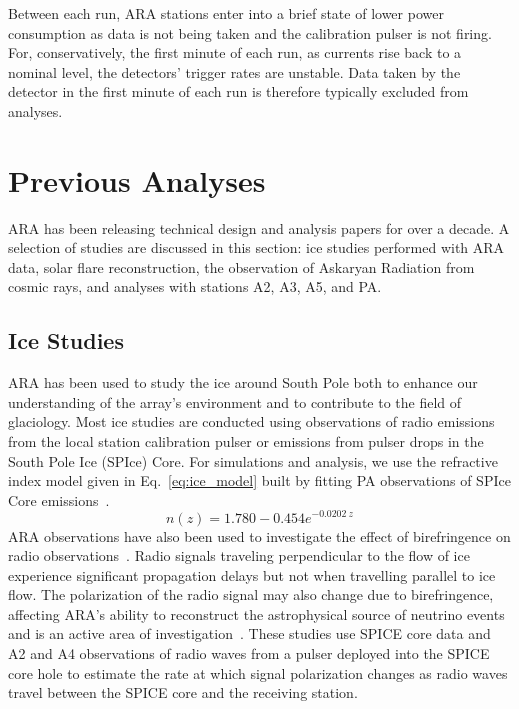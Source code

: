     Between each run, ARA stations enter into a brief state of lower power consumption as data is not being taken and the calibration pulser is not firing. 
    For, conservatively, the first minute of each run, as currents rise back to a nominal level, the detectors' trigger rates are unstable.
    Data taken by the detector in the first minute of each run is therefore typically excluded from analyses. 

\section{Previous Analyses} 

  ARA has been releasing technical design and analysis papers for over a decade. A selection of studies are discussed in this section: ice studies performed with ARA data, solar flare reconstruction, the observation of Askaryan Radiation from cosmic rays, and analyses with stations A2, A3, A5, and PA. 

\subsection{Ice Studies} 

  ARA has been used to study the ice around South Pole both to enhance our understanding of the array's environment and to contribute to the field of glaciology. 
  Most ice studies are conducted using observations of radio emissions from the local station calibration pulser or emissions from pulser drops in the South Pole Ice (SPIce) Core. 
  For simulations and analysis, we use the refractive index model given in Eq.~\ref{eq:ice_model} built by fitting PA observations of SPIce Core emissions~\citep{ara_pa_analysis}.
  \begin{equation}
    n(z) = 1.780 - 0.454 e^{-0.0202~z}
    \label{eq:ice_model}
  \end{equation}
  ARA observations have also been used to investigate the effect of birefringence on radio observations~\citep{ice2019}. 
  Radio signals traveling perpendicular to the flow of ice experience significant propagation delays but not when travelling parallel to ice flow. 
  The polarization of the radio signal may also change due to birefringence, affecting ARA's ability to reconstruct the astrophysical source of neutrino events and is an active area of investigation~\citep{ara_birefringence}.
  These studies use SPICE core data and A2 and A4 observations of radio waves from a pulser deployed into the SPICE core hole to estimate the rate at which signal polarization changes as radio waves travel between the SPICE core and the receiving station.


